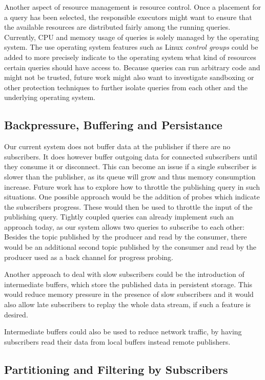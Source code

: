 Another aspect of resource management is resource control. Once a placement
for a query has been selected, the responsible executors might want to ensure
that the available resources are distributed fairly among the
running queries. Currently, CPU and memory usage of queries is solely managed
by the operating system. The use operating system features such as
Linux \emph{control groups} \cite{cgroups} could be added to more precisely indicate
to the operating system what kind of resources certain queries should have
access to. Because queries can run arbitrary code and might not be trusted,
future work might also want to investigate sandboxing or other protection
techniques to further isolate queries from each other and the underlying operating
system.

\subsection{Backpressure, Buffering and Persistance}

Our current system does not buffer data at the publisher if there are no
subscribers. It does however buffer outgoing data for connected subscribers
until they consume it or disconnect. This can become an issue if a single
subscriber is slower than the publisher, as its queue will grow and thus
memory consumption increase. Future work has to explore how to throttle
the publishing query in such situations. One possible approach would be the
addition of probes which indicate the subscribers progress. These would then
be used to throttle the input of the publishing query. Tightly coupled queries
can already implement such an approach today, as our system allows two queries
to subscribe to each other: Besides the topic published by the producer and
read by the consumer, there would be an additional second topic published by the
consumer and read by the producer used as a back channel for progress probing.

Another approach to deal with slow subscribers could be the introduction of
intermediate buffers, which store the published data in persistent storage. 
This would reduce memory pressure in the presence of slow subscribers and it
would also allow late subscribers to replay the whole data stream, if such
a feature is desired.

Intermediate buffers could also be used to reduce network traffic, by having
subscribers read their data from local buffers instead remote publishers.

\subsection{Partitioning and Filtering by Subscribers}

